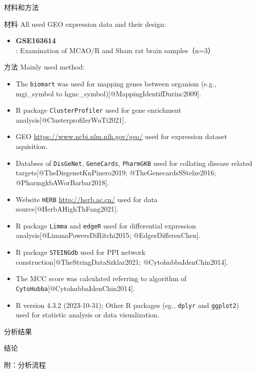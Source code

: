 \documentclass[
  ignorenonframetext,
]{beamer}
\providecommand{\tightlist}{%
  \setlength{\itemsep}{0pt}\setlength{\parskip}{0pt}}
\begin{document}
\begin{frame}[fragile]{材料和方法}
\protect\hypertarget{methods}{}
\begin{block}{材料}
\protect\hypertarget{ux6750ux6599}{}
All used GEO expression data and their design:

\begin{itemize}
\tightlist
\item
  \textbf{GSE163614}: Examination of MCAO/R and Sham rat brain
  samples（n=3）
\end{itemize}
\end{block}

\begin{block}{方法}
\protect\hypertarget{ux65b9ux6cd5}{}
Mainly used method:

\begin{itemize}
\tightlist
\item
  The \texttt{biomart} was used for mapping genes between organism
  (e.g., mgi\_symbol to hgnc\_symbol){[}@MappingIdentifDurinc2009{]}.
\item
  R package \texttt{ClusterProfiler} used for gene enrichment
  analysis{[}@ClusterprofilerWuTi2021{]}.
\item
  GEO \url{https://www.ncbi.nlm.nih.gov/geo/} used for expression
  dataset aquisition.
\item
  Databses of \texttt{DisGeNet}, \texttt{GeneCards}, \texttt{PharmGKB}
  used for collating disease related targets{[}@TheDisgenetKnPinero2019;
  @TheGenecardsSStelze2016; @PharmgkbAWorBarbar2018{]}.
\item
  Website \texttt{HERB} \url{http://herb.ac.cn/} used for data
  source{[}@HerbAHighThFang2021{]}.
\item
  R package \texttt{Limma} and \texttt{edgeR} used for differential
  expression analysis{[}@LimmaPowersDiRitchi2015; @EdgerDifferenChen{]}.
\item
  R package \texttt{STEINGdb} used for PPI network
  construction{[}@TheStringDataSzklar2021; @CytohubbaIdenChin2014{]}.
\item
  The MCC score was calculated referring to algorithm of
  \texttt{CytoHubba}{[}@CytohubbaIdenChin2014{]}.
\item
  R version 4.3.2 (2023-10-31); Other R packages (eg., \texttt{dplyr}
  and \texttt{ggplot2}) used for statistic analysis or data
  visualization.
\end{itemize}
\end{block}
\end{frame}

\begin{frame}{分析结果}
\protect\hypertarget{results}{}
\end{frame}

\begin{frame}{结论}
\protect\hypertarget{dis}{}
\end{frame}

\begin{frame}{附：分析流程}
\protect\hypertarget{workflow}{}
\end{frame}
\end{document}
